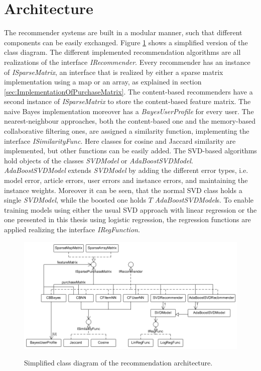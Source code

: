 \documentclass[10pt]{reportMaster}
\begin{document}
\section{Architecture}
\label{sec:Architecture}
The recommender systems are built in a modular manner, such that different components can be easily exchanged.
Figure \ref{fig:classDiagram} shows a simplified version of the class diagram.
The different implemented recommendation algorithms are all realizations of the interface \textit{IRecommender}.
Every recommender has an instance of \textit{ISparseMatrix}, an interface that is realized by either a sparse matrix implementation using a map or an array, as explained in section \ref{sec:ImplementationOfPurchaseMatrix}.
The content-based recommenders have a second instance of \textit{ISparseMatrix} to store the content-based feature matrix.
The naive Bayes implementation moreover has a \textit{BayesUserProfile} for every user.
The nearest-neighbour approaches, both the content-based one and the memory-based collaborative filtering ones, are assigned a similarity function, implementing the interface \textit{ISimilarityFunc}.
Here classes for cosine and Jaccard similarity are implemented, but other functions can be easily added.
The SVD-based algorithms hold objects of the classes \textit{SVDModel} or \textit{AdaBoostSVDModel}.
\textit{AdaBoostSVDModel} extends \textit{SVDModel} by adding the different error types, i.e. model error, article errors, user errors and instance errors, and maintaining the instance weights.
Moreover it can be seen, that the normal SVD class holds a single \textit{SVDModel}, while the boosted one holds $T$ \textit{AdaBoostSVDModel}s.
To enable training models using either the usual SVD approach with linear regression or the one presented in this thesis using logistic regression, the regression functions are applied realizing the interface \textit{IRegFunction}.

\begin{figure}[h!]
	\centering
	\includegraphics[width=1\textwidth]{figures/implementation/classDiagram}
	\caption[Class diagram]{Simplified class diagram of the recommendation architecture.}
	\textit{}\label{fig:classDiagram}
\end{figure}
\end{document}
